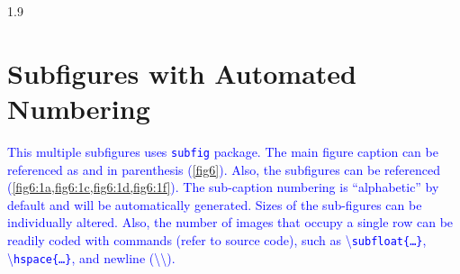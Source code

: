\documentclass[phd]{ndsu-thesis-2022}
\newcommand\myspacing{1.9} %
\newcommand\italk[1]{\textcolor{blue}{#1}}  %
\newcommand\cmd[1]{\textbackslash\texttt{#1}}  %
\begin{document}
\begin{spacing}{\myspacing}

\section{Subfigures with Automated Numbering}
 \italk{This multiple subfigures uses \texttt{subfig} package. The main figure caption can be referenced as \Cref{fig6} and in parenthesis (\cref{fig6}). Also, the subfigures can be referenced (\cref{fig6:1a,fig6:1c,fig6:1d,fig6:1f}). The sub-caption numbering is ``alphabetic'' by default and will be automatically generated. Sizes of the sub-figures can be individually altered. Also, the number of images that occupy a single row can be readily coded with commands (refer to source code), such as \cmd{subfloat\{\ldots\}}, \cmd{hspace\{\ldots\}}, and newline (\textbackslash\textbackslash).} 
 
\begin{figure}[H]
\captionsetup{singlelinecheck=true} %
\centering
{}\hspace{1in}
\\
\hspace{0.5in}\\


\end{figure}
\end{spacing}
\end{document}
